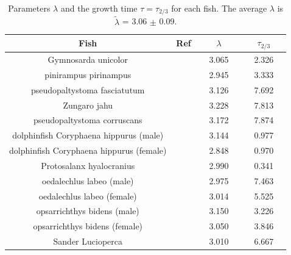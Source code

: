 \documentclass[12pt]{iopart}
\begin{document}
\begin{table}%
\centering
\begin{tabular}{|c|c|c|c|}
\hline
Fish                                     & Ref                                                       & $\lambda$                     & $\tau_{2/3}$                  \\ \hline
Gymnosarda unicolor                      & ~~\cite{Joshi12}~~& ~~3.065~~ & ~~2.326~~ \\
pinirampus pirinampus                    & \cite{Mateus07}                        & 2.945                         & 3.333                         \\
pseudopaltystoma fasciatutum             & \cite{Mateus07}                        & 3.126                         & 7.692                         \\
Zungaro jahu                             & \cite{Mateus07}                        & 3.228                         & 7.813                         \\
pseudopaltystoma corruscans              & \cite{Mateus07}                        & 3.172                         & 7.874                         \\
dolphinfish Coryphaena hippurus (male)   & \cite{Alejo-Plata11}                   & 3.144                         & 0.977                         \\
dolphinfish Coryphaena hippurus (female) & \cite{Alejo-Plata11}                   & 2.848                         & 0.970                         \\
Protosalanx hyalocranius                 & \cite{Tang12}                          & 2.990                         & 0.341                         \\
oedalechlus labeo (male)                 & \cite{Matic-Skoko12}                   & 2.975                         & 7.463                         \\
oedalechlus labeo (female)               & \cite{Matic-Skoko12}                   & 3.014                         & 5.525                         \\
opsarrichthys bidens (male)              & \cite{Sui12}                           & 3.150                         & 3.226                         \\
opsarrichthys bidens (female)            & \cite{Sui12}                           & 3.050                         & 3.846                         \\
Sander Lucioperca                        & \cite{Perez-Bote12}                    & 3.010                         & 6.667                         \\ \hline
\end{tabular}
\caption{Parameters $\lambda$ and the growth time $\tau=\tau_{2/3}$ for each fish.  The average $\lambda$ is $\tilde{\lambda}$ = 3.06 $\pm$ 0.09.}
\label{tab1}
\end{table}  
\end{document}
